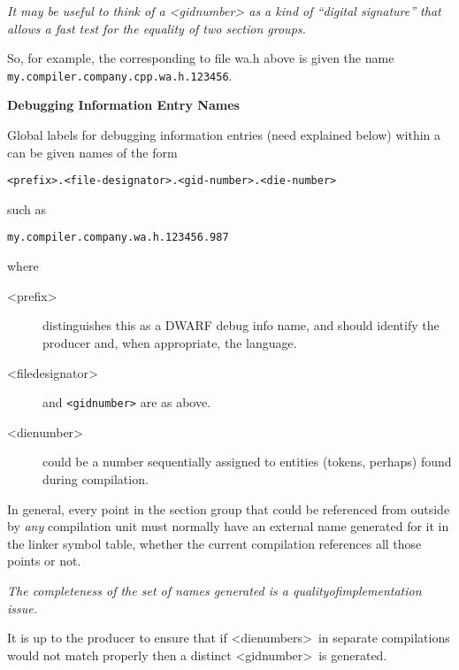 \textit{It may be useful to think of a 
\textless gid\dash number\textgreater
as a kind
of ``digital signature'' that allows a fast test for the
equality of two 
section groups.}

So, for example, the  
corresponding to file wa.h
above is given the name \texttt{my.compiler.company.cpp.wa.h.123456}.



\textbf{Debugging Information Entry Names}

Global labels for 
debugging information entries (need explained
below) within a 
can be given names of the form

\begin{alltt}
    <prefix>.<file-designator>.<gid-number>.<die-number>
\end{alltt}

such as

\begin{alltt}
    my.compiler.company.wa.h.123456.987
\end{alltt}

where
\begin{description}
\item [\textless prefix\textgreater]  
distinguishes this as a DWARF debug info name, and should identify the producer
and, when appropriate, the language.
\item [\textless file\dash designator\textgreater]  
and 
\texttt{\textless gid\dash number\textgreater} 
are as above.

\item  [\textless die\dash number\textgreater]
could be a number sequentially assigned 
to entities (tokens, perhaps) found
during compilation.

\end{description}

In general, every point in the 
section group 
\dotdebuginfo{} that
could be referenced from outside by \emph{any} compilation unit must
normally have an external name generated for it in the linker
symbol table, whether the current compilation references all
those points or not.

\textit{The completeness of the set of names generated is a
quality\dash of\dash implementation issue.}

It is up to the producer to ensure that if 
\textless die\dash numbers\textgreater\ 
in separate compilations would not match properly then a
distinct 
\textless gid\dash number\textgreater\ 
is generated.

